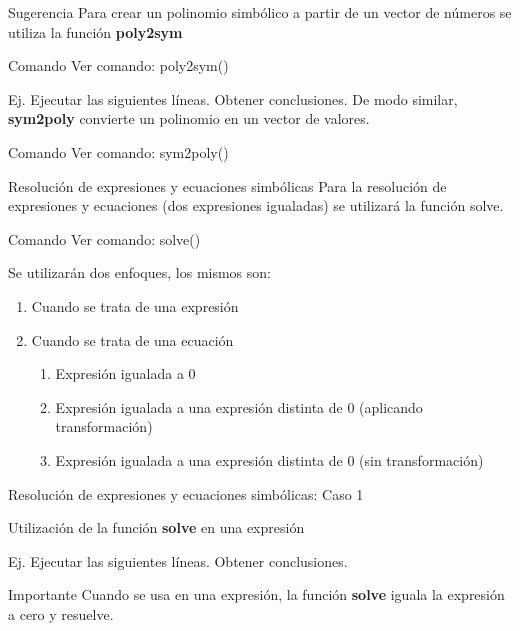 \documentclass{bredelebeamer}
\begin{document}
\begin{frame}{Sugerencia}
Para crear un polinomio simbólico a partir de un vector de números se utiliza la función \textbf{poly2sym}
\begin{exampleblock}{Comando}
Ver comando: poly2sym()
\end{exampleblock}
Ej. Ejecutar las siguientes líneas. Obtener conclusiones.
De modo similar, \textbf{sym2poly} convierte un polinomio en un vector de valores.
\begin{exampleblock}{Comando}
Ver comando: sym2poly()
\end{exampleblock}
\end{frame}

\begin{frame}{Resolución de expresiones y ecuaciones simbólicas}
Para la resolución de expresiones y ecuaciones (dos expresiones igualadas) se utilizará la función solve.
\begin{exampleblock}{Comando}
Ver comando: solve()
\end{exampleblock}
Se utilizarán dos enfoques, los mismos son:
\begin{enumerate}
\item Cuando se trata de una expresión
\item Cuando se trata de una ecuación
\begin{enumerate}
\item Expresión igualada a 0
\item Expresión igualada a una expresión distinta de 0 (aplicando transformación)
\item Expresión igualada a una expresión distinta de 0 (sin transformación)
\end{enumerate}
\end{enumerate}
\end{frame}

\begin{frame}{Resolución de expresiones y ecuaciones simbólicas: Caso 1}
\begin{center}
Utilización de la función \textbf{solve} en una expresión
\end{center}
Ej. Ejecutar las siguientes líneas. Obtener conclusiones.
\begin{alertblock}{Importante}
Cuando se usa en una expresión, la función \textbf{solve} iguala la expresión a cero y resuelve.
\end{alertblock}
\end{frame}
\end{document}
